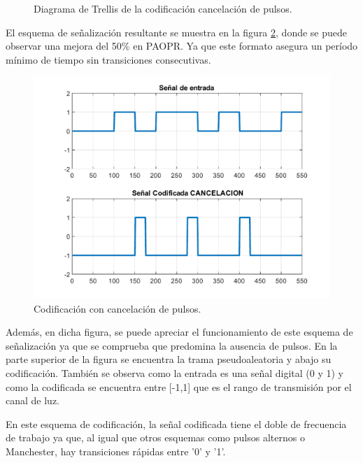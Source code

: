 \begin{figure}[ht]
    \centering
    
    \caption{\small{Diagrama de Trellis de la codificación cancelación de pulsos.}}
    \label{trellis_cancelacion}%
\end{figure}

El esquema de señalización resultante se muestra en la figura \ref{codificación_cancelacion},
donde se puede observar una mejora del 50\% en PAOPR. Ya que este formato asegura un 
período mínimo de tiempo sin transiciones consecutivas.

\begin{figure}[ht]
    \centering
    \includegraphics[scale=0.6]{./figuras/CodificadaCancelacion.pdf}
    \caption{\small{Codificación con cancelación de pulsos.}}
    \label{codificación_cancelacion}%
\end{figure}

Además, en dicha figura, se puede apreciar el funcionamiento de este esquema de señalización 
ya que se comprueba que predomina la ausencia de pulsos. En la parte superior de la figura 
se encuentra la trama pseudoaleatoria y abajo su codificación. También se 
observa como la entrada es una señal digital (0 y 1) y como la codificada se encuentra
entre [-1,1] que es el rango de transmisión por el canal de luz.

En este esquema de codificación, la señal codificada tiene el doble de frecuencia de 
trabajo ya que, al igual que otros esquemas como pulsos alternos o Manchester, hay 
transiciones rápidas entre '0' y '1'. 

